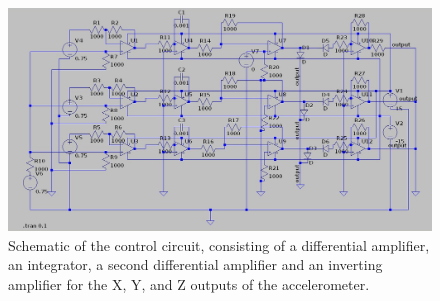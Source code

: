 
\begin{figure}[h]
	\centering
	\includegraphics[width=\textwidth]{ctrl.jpg}
	\caption{Schematic of the control circuit, consisting of a differential amplifier, an integrator, a second differential amplifier and an inverting amplifier for the X, Y, and Z outputs of the accelerometer.}
	\label{fig:ctrl}
\end{figure}
